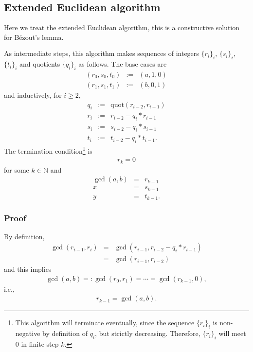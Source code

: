 \documentclass[11pt]{book}
\begin{document}
\subsection{Extended Euclidean algorithm}
\label{exGCD}
Here we treat the extended Euclidean algorithm, this is a constructive solution for B\'ezout's lemma.

As intermediate steps, this algorithm makes sequences of integers $\{r_i\}_i$, $\{s_i\}_i$, $\{t_i\}_i$ and quotients $\{q_i\}_i$ as follows.
The base cases are
\begin{eqnarray}
\left(r_0, s_0, t_0 \right) &:=& (a,1,0) \\
\left(r_1, s_1, t_1 \right) &:=& (b,0,1) 
\end{eqnarray}
and inductively, for $i \geq 2$,
\begin{eqnarray}
q_i &:=& \text{quot}(r_{i-2}, r_{i-1}) \\
r_i &:=& r_{i-2} - q_i * r_{i-1} \\
s_i &:=& s_{i-2} - q_i * s_{i-1} \\
t_i &:=& t_{i-2} - q_i * t_{i-1}.
\end{eqnarray}
The termination condition\footnote{
This algorithm will terminate eventually, since the sequence $\{r_i\}_i$ is non-negative by definition of $q_i$, but strictly decreasing.
Therefore, $\{r_i\}_i$ will meet $0$ in finite step $k$.
} is
\begin{eqnarray}
r_k = 0
\end{eqnarray}
for some $k \in \mathbb{N}$ and
\begin{eqnarray}
\gcd(a,b) &=& r_{k-1} \\
x &=& s_{k-1} \\
y &=& t_{k-1}.
\end{eqnarray}

\subsubsection{Proof}
By definition,
\begin{eqnarray}
\gcd(r_{i-1}, r_i) &=& \gcd(r_{i-1}, r_{i-2} - q_i * r_{i-1}) \\
&=& \gcd(r_{i-1}, r_{i-2})
\end{eqnarray}
and this implies 
\begin{eqnarray}
\gcd(a,b) =: \gcd(r_0, r_1) = \cdots = \gcd(r_{k-1}, 0),
\end{eqnarray}
i.e., 
\begin{eqnarray}
r_{k-1} = \gcd(a,b).
\end{eqnarray}
\end{document}
